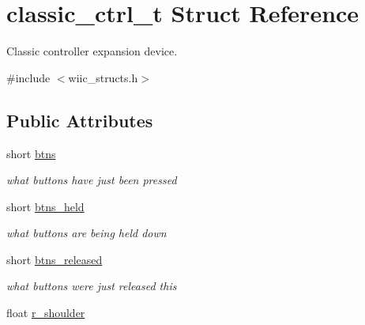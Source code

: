 \hypertarget{structclassic__ctrl__t}{\section{classic\-\_\-ctrl\-\_\-t Struct Reference}
\label{structclassic__ctrl__t}
}


Classic controller expansion device.  




{\ttfamily \#include $<$wiic\-\_\-structs.\-h$>$}

\subsection*{Public Attributes}
\begin{DoxyCompactItemize}
\item 
\hypertarget{structclassic__ctrl__t_a6035a8a1bea040f9e2ee8847e86450fd}{short \hyperlink{structclassic__ctrl__t_a6035a8a1bea040f9e2ee8847e86450fd}{btns}}\label{structclassic__ctrl__t_a6035a8a1bea040f9e2ee8847e86450fd}

\begin{DoxyCompactList}\small\item\em what buttons have just been pressed \end{DoxyCompactList}\item 
\hypertarget{structclassic__ctrl__t_a5a2241beaae82ad81a653ffb2df74be3}{short \hyperlink{structclassic__ctrl__t_a5a2241beaae82ad81a653ffb2df74be3}{btns\-\_\-held}}\label{structclassic__ctrl__t_a5a2241beaae82ad81a653ffb2df74be3}

\begin{DoxyCompactList}\small\item\em what buttons are being held down \end{DoxyCompactList}\item 
\hypertarget{structclassic__ctrl__t_a1e692fc1a2696dc63c8bd1f63d5c1e21}{short \hyperlink{structclassic__ctrl__t_a1e692fc1a2696dc63c8bd1f63d5c1e21}{btns\-\_\-released}}\label{structclassic__ctrl__t_a1e692fc1a2696dc63c8bd1f63d5c1e21}

\begin{DoxyCompactList}\small\item\em what buttons were just released this \end{DoxyCompactList}\item 
\hypertarget{structclassic__ctrl__t_aa3957631edebe03ac120c847b11ff7da}{float \hyperlink{structclassic__ctrl__t_aa3957631edebe03ac120c847b11ff7da}{r\-\_\-shoulder}}\label{structclassic__ctrl__t_aa3957631edebe03ac120c847b11ff7da}


\end{DoxyCompactItemize}
